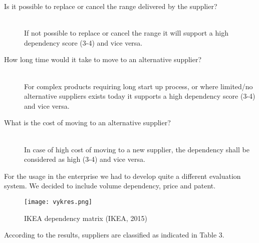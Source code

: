 \documentclass[oneside,12pt]{article}%
\begin{document}
\begin{description}
  \item[Is it possible to replace or cancel the range delivered by the supplier? ] \hfill \\
  If not possible to replace or cancel the range it will support a high dependency score (3-4) and vice versa.

  \item[How long time would it take to move to an alternative supplier? ] \hfill \\
  For complex products requiring long start up process, or where limited/no alternative suppliers exists today it supports a high dependency score (3-4) and vice versa.

  \item[What is the cost of moving to an alternative supplier?] \hfill \\
  In case of high cost of moving to a new supplier, the dependency shall be considered as high (3-4) and vice versa.

\end{description}

For the usage in the enterprise we had to develop quite a different evaluation system. We decided to include volume dependency, price and patent.


\begin{figure}[ht!]
  \texttt{[image: vykres.png]}
  \caption{IKEA dependency matrix (IKEA, 2015)}
\end{figure}


According to the results, suppliers are classified as indicated in Table 3.

\end{document}

